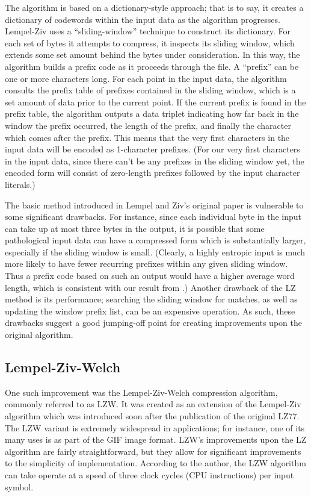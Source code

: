 \documentclass[12pt]{article}
\begin{document}
The algorithm is based on a dictionary-style approach; that is to say,
it creates a dictionary of codewords within the input data as the
algorithm progresses. Lempel-Ziv uses a ``sliding-window'' technique
to construct its dictionary. For each set of bytes it attempts to
compress, it inspects its sliding window, which extends some set
amount behind the bytes under consideration. In this way, the
algorithm builds a prefix code as it proceeds through the file. A
``prefix'' can be one or more characters long. For each point in the
input data, the algorithm consults the prefix table of prefixes
contained in the sliding window, which is a set amount of data prior
to the current point. If the current prefix is found in the prefix
table, the algorithm outputs a data triplet indicating how far back in
the window the prefix occurred, the length of the prefix, and finally
the character which comes after the prefix. This means that the very
first characters in the input data will be encoded as 1-character
prefixes. (For our very first characters in the input data, since
there can't be any prefixes in the sliding window yet, the encoded
form will consist of zero-length prefixes followed by the input
character literals.)

The basic method introduced in Lempel and Ziv's original paper is
vulnerable to some significant drawbacks. For instance, since each
individual byte in the input can take up at most three bytes in the
output, it is possible that some pathological input data can have a
compressed form which is substantially larger, especially if the
sliding window is small. (Clearly, a highly entropic input is much
more likely to have fewer recurring prefixes within any given sliding
window. Thus a prefix code based on such an output would have a higher
average word length, which is consistent with our result from
.) Another drawback of the LZ method is its performance;
searching the sliding window for matches, as well as updating the
window prefix list, can be an expensive operation. As such, these
drawbacks suggest a good jumping-off point for creating improvements
upon the original algorithm.

\subsection{Lempel-Ziv-Welch}

One such improvement was the Lempel-Ziv-Welch compression algorithm,
commonly referred to as LZW. It was created as an extension of the
Lempel-Ziv algorithm which was introduced soon after the publication
of the original LZ77. The LZW variant is extremely widespread in
applications; for instance, one of its many uses is as part of the GIF
image format. LZW's improvements upon the LZ algorithm are fairly
straightforward, but they allow for significant improvements to the
simplicity of implementation. According to the author, the LZW
algorithm can take operate at a speed of three clock cycles (CPU
instructions) per input symbol. \cite{LempelZivWelch}
\end{document}
